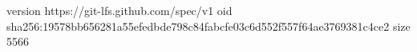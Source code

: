 version https://git-lfs.github.com/spec/v1
oid sha256:19578bb656281a55efedbde798c84fabcfe03c6d552f557f64ae3769381c4ce2
size 5566
